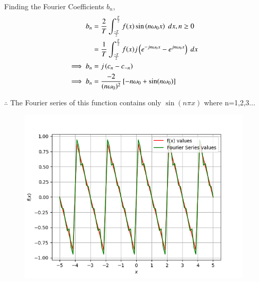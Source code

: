 \documentclass[journal,12pt,onecolumn]{IEEEtran}
\theoremstyle{remark}
\begin{document}
Finding the Fourier Coefficients $b_n$,
\begin{align}
    b_n&=\frac{2}{T}\int_{\frac{-T}{2}}^{\frac{T}{2}}f(x)\sin\left(n\omega_{0}x\right)\;dx, n \geq 0 \\
    &= \frac{1}{T}\int_{\frac{-T}{2}}^{\frac{T}{2}}f(x)j\left(e^{-jn\omega_{0}x}-e^{jn\omega_{0}x}\right) \; dx \\
   \implies b_n &= j\left(c_{n} - c_{-n}\right) \\
   \implies b_n&= \frac{-2}{(n\omega_{0})^2}{}\left[-n\omega_{0} +  \sin(n\omega_{0})\right] 
\end{align}  

 $\therefore$ The Fourier series of this function contains only $\sin(n\pi x)$ where n=1,2,3...
 
 \begin{figure}[!ht]
    \centering
     \includegraphics[width=\columnwidth]{./figs/f.png}
    \caption{}    
    \label{fig:ishitha.g22.in.13.f1}
\end{figure}
 
\end{document}
